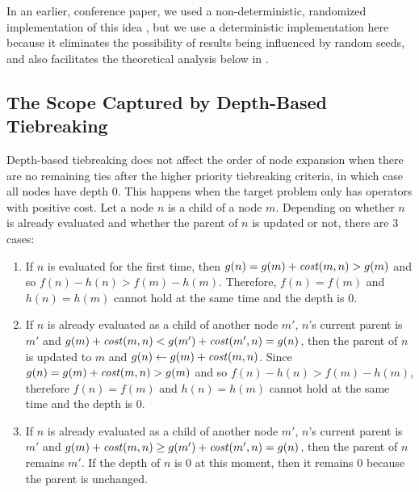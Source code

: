 In an earlier, conference paper, we used a non-deterministic,
randomized implementation of this idea \cite{Asai2016}, but we use a deterministic
implementation here because it eliminates the possibility of results being influenced by random seeds,
and also facilitates the  theoretical analysis below in .


\subsection{The Scope Captured by Depth-Based Tiebreaking}

Depth-based tiebreaking does not affect the order of node expansion when there are no remaining ties after the
higher priority tiebreaking criteria, in which case all nodes have depth 0. 
% 
This happens when the target problem only has operators with positive cost.
Let a node $n$ is a child of a node $m$. Depending on whether $n$ is already evaluated and whether the parent of $n$ is updated or not, there are 3 cases:

\begin{enumerate}
 \item If $n$ is evaluated for the first time,
       then $g(n)=g(m)+\mit{cost}(m,n) > g(m)$ and so $f(n)-h(n) > f(m)-h(m)$.
       Therefore, $f(n)=f(m)$ and $h(n)=h(m)$ cannot hold at the same time and the depth is 0.
 \item If $n$ is already evaluated as a child of another node $m'$, $n$'s current parent is $m'$ and
       $g(m)+\mit{cost}(m,n) < g(m') + \mit{cost}(m',n) = g(n)$,
       then the parent of $n$ is updated to $m$ and $g(n)\leftarrow g(m)+\mit{cost}(m,n)$.
       Since $g(n)=g(m)+\mit{cost}(m,n)>g(m)$ and so $f(n)-h(n) > f(m)-h(m)$,
       therefore $f(n)=f(m)$ and $h(n)=h(m)$ cannot hold at the same time and the depth is 0.
 \item If $n$ is already evaluated as a child of another node $m'$, $n$'s current parent is $m'$ and
       $g(m)+\mit{cost}(m,n) \geq g(m') + \mit{cost}(m',n) = g(n)$, then the parent of $n$ remains $m'$. If the
       depth of $n$ is 0 at this moment, then it remains 0 because the parent is unchanged.
\end{enumerate}


